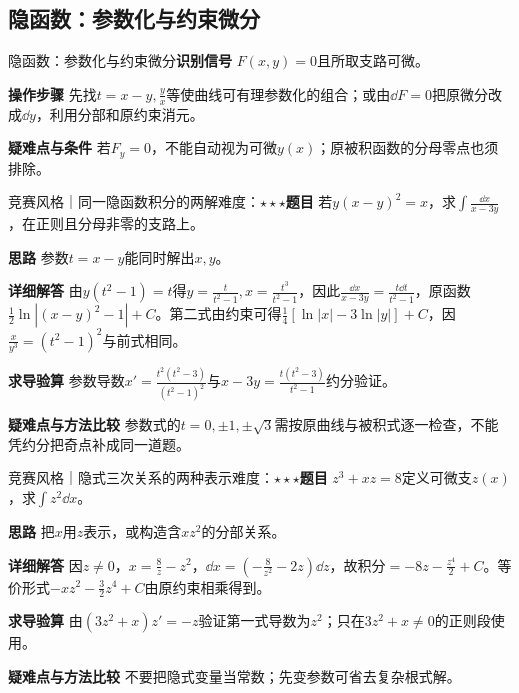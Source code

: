 \subsection{隐函数：参数化与约束微分}\label{ic:indefinite_dual_complete:implicit}\begin{method}{隐函数：参数化与约束微分}\textbf{识别信号} $F(x,y)=0$且所取支路可微。\par \textbf{操作步骤} 先找$t=x-y,\frac{y}{x}$等使曲线可有理参数化的组合；或由$\dd F=0$把原微分改成$\dd y$，利用分部和原约束消元。\par \textbf{疑难点与条件} 若$F_y=0$，不能自动视为可微$y(x)$；原被积函数的分母零点也须排除。\end{method}

\begin{example}{竞赛风格｜同一隐函数积分的两解}{难度：$\star\star\star$}\label{ic:ex:indefinite_dual_complete:implicitcurve}\textbf{题目} 若$y(x-y)^2=x$，求$\int\frac{\dd x}{x-3y}$，在正则且分母非零的支路上。\par \textbf{思路} 参数$t=x-y$能同时解出$x,y$。\par \textbf{详细解答} 由$y(t^2-1)=t$得$y=\frac{t}{t^2-1},x=\frac{t^3}{t^2-1}$，因此$\frac{\dd x}{x-3y}=\frac{t\dd t}{t^2-1}$，原函数$\frac12\ln|(x-y)^2-1|+C$。第二式由约束可得$\frac14[\ln|x|-3\ln|y|]+C$，因$\frac{x}{y^3}=(t^2-1)^2$与前式相同。\par \textbf{求导验算} 参数导数$x'=\frac{t^2(t^2-3)}{(t^2-1)^2}$与$x-3y=\frac{t(t^2-3)}{t^2-1}$约分验证。\par \textbf{疑难点与方法比较} 参数式的$t=0,\pm1,\pm\sqrt3$需按原曲线与被积式逐一检查，不能凭约分把奇点补成同一道题。\end{example}

\begin{example}{竞赛风格｜隐式三次关系的两种表示}{难度：$\star\star\star$}\label{ic:ex:indefinite_dual_complete:implicitcubic}\textbf{题目} $z^3+xz=8$定义可微支$z(x)$，求$\int z^2\dd x$。\par \textbf{思路} 把$x$用$z$表示，或构造含$xz^2$的分部关系。\par \textbf{详细解答} 因$z\ne0$，$x=\frac{8}{z}-z^2$，$\dd x=(-\frac{8}{z^2}-2z)\dd z$，故积分$=-8z-\frac{z^4}{2}+C$。等价形式$-xz^2-\frac32z^4+C$由原约束相乘得到。\par \textbf{求导验算} 由$(3z^2+x)z'=-z$验证第一式导数为$z^2$；只在$3z^2+x\ne0$的正则段使用。\par \textbf{疑难点与方法比较} 不要把隐式变量当常数；先变参数可省去复杂根式解。\end{example}
